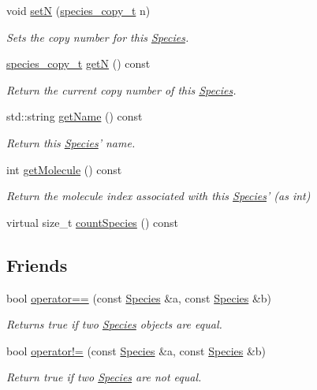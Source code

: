 \begin{DoxyCompactItemize}
void \hyperlink{classchem_1_1Species_af10a33a212fdb986fb93613e9c219f7a}{set\-N} (\hyperlink{common_8h_a3503f321fd36304ee274141275cca586}{species\-\_\-copy\-\_\-t} n)
\begin{DoxyCompactList}\small\item\em Sets the copy number for this \hyperlink{classchem_1_1Species}{Species}. \end{DoxyCompactList}\item 
\hyperlink{common_8h_a3503f321fd36304ee274141275cca586}{species\-\_\-copy\-\_\-t} \hyperlink{classchem_1_1Species_af7c9f51060b84169b428a7796dad6dca}{get\-N} () const 
\begin{DoxyCompactList}\small\item\em Return the current copy number of this \hyperlink{classchem_1_1Species}{Species}. \end{DoxyCompactList}\item 
std\-::string \hyperlink{classchem_1_1Species_aa32c8f7fb344c68539a927c6a7f916c7}{get\-Name} () const 
\begin{DoxyCompactList}\small\item\em Return this \hyperlink{classchem_1_1Species}{Species}' name. \end{DoxyCompactList}\item 
int \hyperlink{classchem_1_1Species_a330ef4514a8979a6ea0e6f71ed5cb820}{get\-Molecule} () const 
\begin{DoxyCompactList}\small\item\em Return the molecule index associated with this \hyperlink{classchem_1_1Species}{Species}' (as int) \end{DoxyCompactList}\item 
virtual size\-\_\-t \hyperlink{classchem_1_1Species_a5e8aedfe4c4b5e08fb0ee672c3d80ace}{count\-Species} () const 
\end{DoxyCompactItemize}
\subsection*{Friends}
\begin{DoxyCompactItemize}
\item 
bool \hyperlink{classchem_1_1Species_a22987c5719b74c50465256ea5b9d80bf}{operator==} (const \hyperlink{classchem_1_1Species}{Species} \&a, const \hyperlink{classchem_1_1Species}{Species} \&b)
\begin{DoxyCompactList}\small\item\em Returns true if two \hyperlink{classchem_1_1Species}{Species} objects are equal. \end{DoxyCompactList}\item 
bool \hyperlink{classchem_1_1Species_aff630d716711fbbab3bc7f598230316b}{operator!=} (const \hyperlink{classchem_1_1Species}{Species} \&a, const \hyperlink{classchem_1_1Species}{Species} \&b)
\begin{DoxyCompactList}\small\item\em Return true if two \hyperlink{classchem_1_1Species}{Species} are not equal. \end{DoxyCompactList}\end{DoxyCompactItemize}



